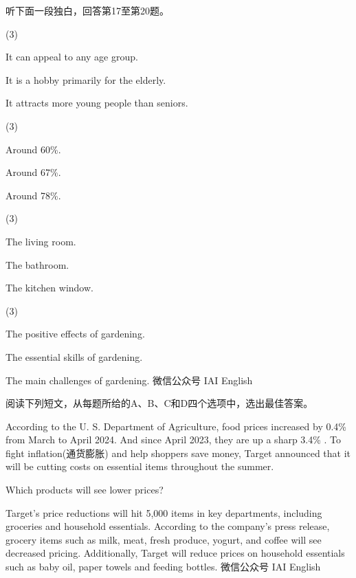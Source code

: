 \documentclass{英语试卷}
\begin{document}
\par 听下面一段独白，回答第17至第20题。\par
{}
\begin{choices}(3)
  \item It can appeal to any age group.
  \item It is a hobby primarily for the elderly.
  \item It attracts more young people than seniors.
\end{choices}
\begin{choices}(3)
  \item Around 60\%.
  \item Around 67\%.
  \item Around 78\%.
\end{choices}
\begin{choices}(3)
  \item The living room.
  \item The bathroom.
  \item The kitchen window.
\end{choices}
\begin{choices}(3)
  \item The positive effects of gardening.
  \item The essential skills of gardening.
  \item The main challenges of gardening. 微信公众号 IAI English
\end{choices}
\par 阅读下列短文，从每题所给的A、B、C和D四个选项中，选出最佳答案。\par
{}
\par According to the U. S. Department of Agriculture, food prices increased by 0.4\% from March to April 2024. And since April 2023, they are up a sharp 3.4\% . To fight inflation(通货膨胀) and help shoppers save money, Target announced that it will be cutting costs on essential items throughout the summer.\par
\par Which products will see lower prices?\par
\par Target's price reductions will hit 5,000 items in key departments, including groceries and household essentials. According to the company's press release, grocery items such as milk, meat, fresh produce, yogurt, and coffee will see decreased pricing. Additionally, Target will reduce prices on household essentials such as baby oil, paper towels and feeding bottles. 微信公众号 IAI English\par
\end{document}
